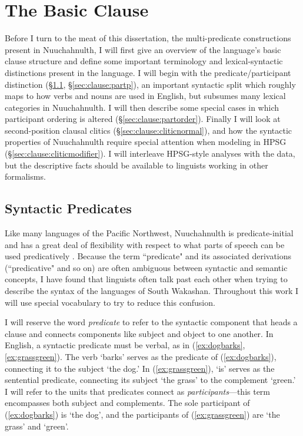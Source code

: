 \chapter{The Basic Clause}
\label{ch:clause}

Before I turn to the meat of this dissertation, the multi-predicate constructions present in Nuuchahnulth, I will first give an overview of the language's basic clause structure and define some important terminology and lexical-syntactic distinctions present in the language. I will begin with the predicate/participant distinction (\S\ref{sec:clause:predp}, \S\ref{sec:clause:partp}), an important syntactic split which roughly maps to how verbs and nouns are used in English, but subsumes many lexical categories in Nuuchahnulth. I will then describe some special cases in which participant ordering is altered (\S\ref{sec:clause:partorder}). Finally I will look at second-position clausal clitics (\S\ref{sec:clause:cliticnormal}), and how the syntactic properties of Nuuchahnulth require special attention when modeling in HPSG (\S\ref{sec:clause:cliticmodifier}). I will interleave HPSG-style analyses with the data, but the descriptive facts should be available to linguists working in other formalisms.

\section{Syntactic Predicates} \label{sec:clause:predp}

Like many languages of the Pacific Northwest, Nuuchahnulth is predicate-initial and has a great deal of flexibility with respect to what parts of speech can be used predicatively \citep{jacobsen1979}. Because the term ``predicate" and its associated derivations (``predicative" and so on) are often ambiguous between syntactic and semantic concepts, I have found that linguists often talk past each other when trying to describe the syntax of the languages of South Wakashan. Throughout this work I will use special vocabulary to try to reduce this confusion.

I will reserve the word \textit{predicate} to refer to the syntactic component that heads a clause and connects components like subject and object to one another. In English, a syntactic predicate must be verbal, as in (\ref{ex:dogbarks},\ref{ex:grassgreen}). The verb `barks' serves as the predicate of (\ref{ex:dogbarks}), connecting it to the subject `the dog.' In (\ref{ex:grassgreen}), `is' serves as the sentential predicate, connecting its subject `the grass' to the complement `green.' I will refer to the units that predicates connect as \textit{participants}---this term encompasses both subject and complements. The sole participant of (\ref{ex:dogbarks}) is `the dog', and the participants of (\ref{ex:grassgreen}) are `the grass' and `green'.

